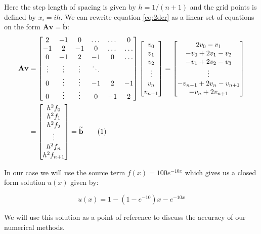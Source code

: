 \documentclass[norsk,a4paper,12pt]{article}
\newcommand\numberthis{\addtocounter{equation}{1}\tag{\theequation}}
\begin{document}
 Here the step length of spacing is given by $h=1/(n+1)$ and the grid points is defined by $x_i=ih$. We can rewrite equation \ref{eq:2der} as a linear set of equations on the form $\textbf{A}\textbf{v}=\tilde{\textbf{b}}$:
\begin{align*}
\textbf{A}\textbf{v}&= \begin{bmatrix} 2 & -1 & 0 & \dots & \dots & 0 \\ -1 & 2 & -1 & 0 & \dots & \dots \\ 0 & -1 & 2 & -1 & 0 & \dots \\ \vdots & \vdots & \vdots & \ddots \\ 0 & \vdots & \vdots & -1 & 2 & -1 \\ 0 & \vdots & \vdots & 0 & -1 & 2  \end{bmatrix}
\begin{bmatrix} v_0 \\ v_1\\ v_2\\ \vdots \\ v_n \\ v_{n+1} \end{bmatrix}=\begin{bmatrix} 2v_0 - v_1 \\ -v_0+2v_1-v_2 \\ -v_1+2v_2-v_3 \\ \vdots \\ -v_{n-1}+2v_n-v_{n+1} \\ -v_n+2v_{n+1}
\end{bmatrix}\\ &=
\begin{bmatrix}h^2f_0 \\ h^2f_1\\ h^2f_2\\ \vdots \\ h^2f_n\\ h^2f_{n+1}\end{bmatrix} = \widetilde{\textbf{b}} \numberthis \label{eq:lineq}
\end{align*}

In our case we will use the source term $f(x)=100e^{-10x}$ which gives us a closed form solution $u(x)$ given by:

\begin{equation}
u(x)=1-(1-e^{-10})x-e^{-10x}
\label{eq:d_i}
\end{equation}

We will use this solution as a point of reference to discuss the accuracy of our numerical methods. 
\end{document}
